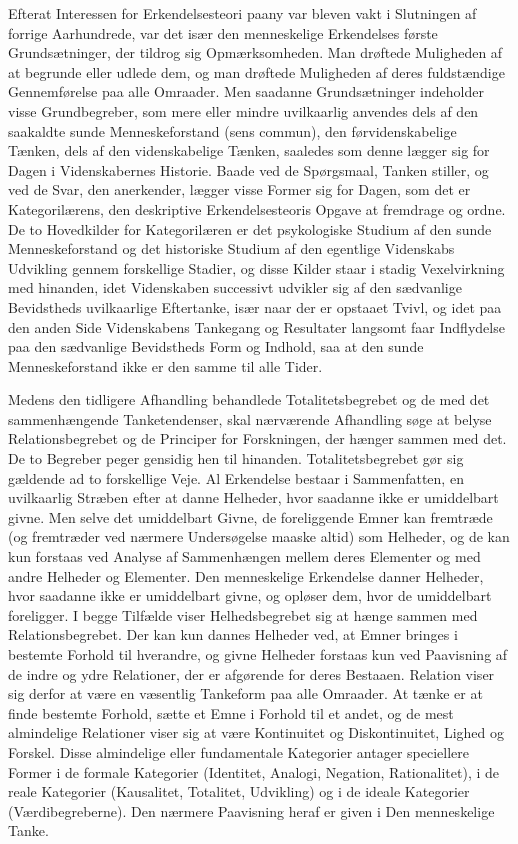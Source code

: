 \documentclass[12pt]{article}
\newcommand{\opage}[1]{\marginnote{\footnotesize\textit{[#1]}}}
\begin{document}
Efterat Interessen for Erkendelsesteori paany var bleven vakt i Slutningen af
forrige Aarhundrede, var det især den menneskelige Erkendelses første
Grundsætninger, der tildrog sig Opmærksomheden. Man drøftede Muligheden af at
begrunde eller udlede dem, og man drøftede Muligheden af deres fuldstændige
Gennemførelse paa alle Omraader. Men saadanne Grundsætninger indeholder visse
Grundbegreber, som mere eller mindre uvilkaarlig anvendes dels af den
saakaldte sunde Menneskeforstand (sens commun), den førvidenskabelige Tænken,
dels af den videnskabelige Tænken, saaledes som denne lægger sig for Dagen i
Videnskabernes Historie. Baade ved de Spørgsmaal, Tanken stiller, og ved
\opage{4} de Svar, den anerkender, lægger visse Former sig for Dagen, som det er
Kategorilærens, den deskriptive Erkendelsesteoris Opgave at fremdrage og
ordne. De to Hovedkilder for Kategorilæren er det psykologiske Studium af den
\guillemotright sunde Menneskeforstand\guillemotleft{} og det historiske
Studium af den egentlige Videnskabs Udvikling gennem forskellige Stadier, og
disse Kilder staar i stadig Vexelvirkning med hinanden, idet Videnskaben
successivt udvikler sig af den sædvanlige Bevidstheds uvilkaarlige Eftertanke,
især naar der er opstaaet Tvivl, og idet paa den anden Side Videnskabens
Tankegang og Resultater langsomt faar Indflydelse paa den sædvanlige
Bevidstheds Form og Indhold, saa at den sunde Menneskeforstand ikke er den
samme til alle Tider.

Medens den tidligere Afhandling behandlede Totalitetsbegrebet og de med det
sammenhængende Tanketendenser, skal nærværende Afhandling søge at belyse
Relationsbegrebet og de Principer for Forskningen, der hænger sammen med det.
De to Begreber peger gensidig hen til hinanden. Totalitetsbegrebet gør sig
gældende ad to forskellige Veje. Al Erkendelse bestaar i Sammenfatten, en
uvilkaarlig Stræben efter at danne Helheder, hvor saadanne ikke er umiddelbart
givne. Men selve det umiddelbart Givne, de foreliggende Emner kan fremtræde
(og fremtræder ved nærmere Undersøgelse maaske altid) som Helheder, og de kan
kun forstaas ved Analyse af Sammenhængen mellem deres Elementer og med andre
Helheder og Elementer. Den menneskelige Erkendelse danner Helheder, hvor
saadanne ikke er umiddelbart givne, og opløser dem, hvor de umiddelbart
foreligger. I begge Tilfælde viser Helhedsbegrebet sig at hænge sammen med
Relationsbegrebet. Der kan kun dannes Helheder ved, at Emner bringes i
bestemte Forhold til hverandre, og givne Helheder forstaas kun ved Paavisning
af de indre og ydre
\opage{5} Relationer, der er afgørende for deres Bestaaen. Relation viser sig derfor at
være en væsentlig Tankeform paa alle Omraader. At tænke er at finde bestemte
Forhold, sætte et Emne i Forhold til et andet, og de mest almindelige
Relationer viser sig at være Kontinuitet og Diskontinuitet, Lighed og Forskel.
Disse almindelige eller fundamentale Kategorier antager speciellere Former i
de formale Kategorier (Identitet, Analogi, Negation, Rationalitet), i de reale
Kategorier (Kausalitet, Totalitet, Udvikling) og i de ideale Kategorier
(Værdibegreberne). Den nærmere Paavisning heraf er given i
\guillemotright Den menneskelige Tanke\guillemotleft.
\end{document}
